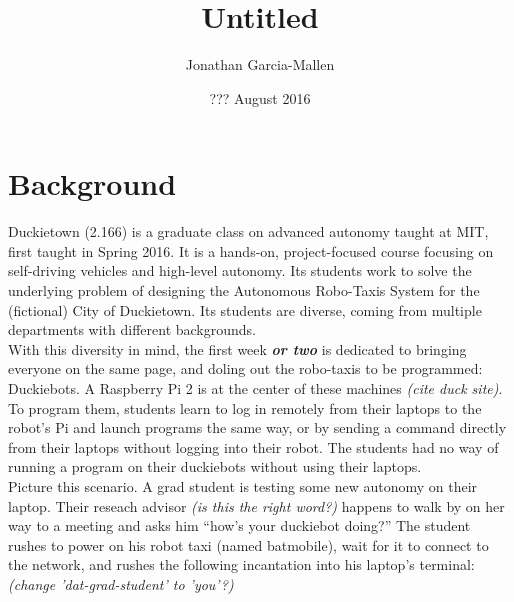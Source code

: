 \documentclass[titlepage]{article}
\title{Untitled}
\author{Jonathan Garcia-Mallen}
\date{??? August 2016}
\begin{document}
\lstset{language=Bash,
  numbers=left,
  stepnumber=3,    
  firstnumber=1,
  numberfirstline=true
}
\maketitle
\tableofcontents

\pagebreak

\section{Background } 
Duckietown (2.166) is a graduate class on advanced autonomy taught at MIT, first taught in Spring 2016. It is a hands-on, project-focused course focusing on self-driving vehicles and high-level autonomy. Its students work to solve the underlying problem of designing the Autonomous Robo-Taxis System for the (fictional) City of Duckietown. Its students are diverse, coming from multiple departments with different backgrounds. 
\\
With this diversity in mind, the first week \textit{\textbf{or two}} is dedicated to bringing everyone on the same page, and doling out the robo-taxis to be programmed: Duckiebots. A Raspberry Pi 2 is at the center of these machines \textit{(cite duck site)}. To program them, students learn to log in remotely from their laptops to the robot's Pi and launch programs the same way, or by sending a command directly from their laptops without logging into their robot. The students had no way of running a program on their duckiebots without using their laptops.
\\
Picture this scenario. A grad student is testing some new autonomy on their laptop. Their reseach advisor \textit{(is this the right word?)} happens to walk by on her way to a meeting and asks him ``how's your duckiebot doing?'' The student rushes to power on his robot taxi (named batmobile), wait for it to connect to the network, and rushes the following incantation into his laptop's terminal: \textit{(change 'dat-grad-student' to 'you'?)}
\end{document}
